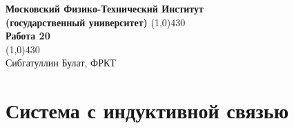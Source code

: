 \documentclass[a4paper, 12pt]{article}%
\begin{document}
\begin{titlepage}

\begin{center}
\large\textbf{Московский Физико-Технический Институт}\\
\large\textbf{(государственный университет)}
\vfill
\line(1,0){430}\\[1mm]
\huge\textbf{Работа 20}\\
\line(1,0){430}\\[1mm]
\vfill
\large Сибгатуллин Булат, ФРКТ\\
\end{center}

\end{titlepage}

\section{Система с индуктивной связью}
\end{document}
